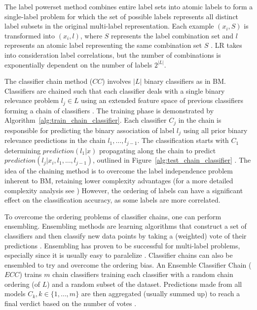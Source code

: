 The label powerset method combines entire label sets into atomic labels 
to form a single-label problem for which the set of possible labels 
represents all distinct label subsets in the original multi-label 
representation. Each example $(x_i, S)$ is transformed into 
$(x_i, l)$, where $S$ represents the label combination set and
$l$ represents an atomic label representing the same combination set $S$
\citep{read2011classifier}. LR takes into 
consideration label correlations, but the number of combinations
is exponentially dependent on the number of labels $2^{|L|}$. 

The classifier chain method ($CC$) involves $|L|$ binary classifiers as in BM. 
Classifiers are chained such that each classifier deals with 
a single binary relevance problem $l_j \in L$ using an extended feature space of 
previous classifiers 
forming a chain of classifiers \citep{read2011classifier}.
The training phase is demonstrated by Algorithm~\ref{alg:train_chain_classifier}. 
Each classifier $C_j$ in the chain is responsible for predicting 
the binary association of label $l_j$ using all prior 
binary relevance predictions in the chain $l_1, \dots, l_{j - 1}$.
The classification starts with $C_1$ determining 
$prediction(l_1 | x)$ propagating along the chain
to predict $prediction(l_j | x_i, l_1, \dots, l_{j-1})$, outlined 
in Figure~\ref{alg:test_chain_classifier}
\citep{read2011classifier}.
The idea of the chaining method is to overcome the label independence problem
inherent to BM, retaining lower complexity advantages
(for a more detailed complexity analysis see \citep{read2011classifier}) 
However, the ordering of labels can have a significant effect on 
the classification accuracy, as some labels are more correlated.

To overcome the ordering problems of classifier chains, one can perform
ensembling.  Ensembling methods are learning algorithms that construct a set of
classifiers and then classify new data points by taking a (weighted) vote of
their predictions \citep{dietterich2000ensemble}.  Ensembling has proven to be
successful for multi-label problems, especially since it is usually easy to
paralelize \citep{tsoumakas2007random}. Classifier chains can also be
ensembled to try and overcome the ordering bias. An Ensemble Classifier Chain
($ECC$) trains $m$ chain classifiers training each classifier with a random
chain ordering (of $L$) and a random subset of the dataset. Predictions made
from all models $C_k, k \in \{1, \dots, m\}$ are then aggregated (usually summed up)
to reach a final verdict based on the number of votes
\citep{dimitriadou2001voting}.

